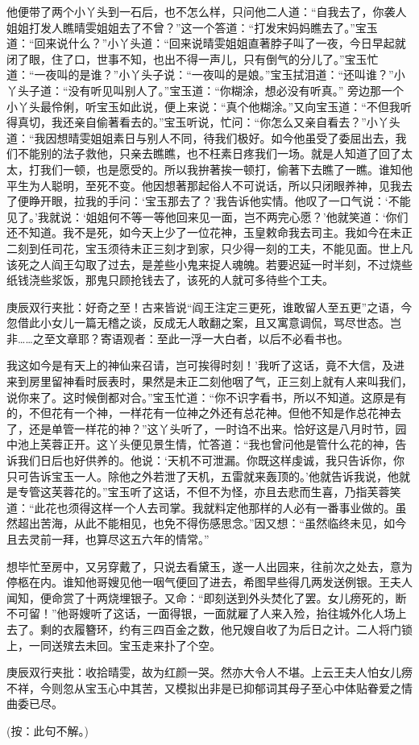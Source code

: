 \begin{parag}
    他便带了两个小丫头到一石后，也不怎么样，只问他二人道：“自我去了，你袭人姐姐打发人瞧晴雯姐姐去了不曾？”这一个答道：“打发宋妈妈瞧去了。”宝玉道：“回来说什么？”小丫头道：“回来说晴雯姐姐直著脖子叫了一夜，今日早起就闭了眼，住了口，世事不知，也出不得一声儿，只有倒气的分儿了。”宝玉忙道：“一夜叫的是谁？”小丫头子说：“一夜叫的是娘。”宝玉拭泪道：“还叫谁？”小丫头子道：“没有听见叫别人了。”宝玉道：“你糊涂，想必没有听真。” 旁边那一个小丫头最伶俐，听宝玉如此说，便上来说：“真个他糊涂。”又向宝玉道：“不但我听得真切，我还亲自偷著看去的。”宝玉听说，忙问：“你怎么又亲自看去？”小丫头道：“我因想晴雯姐姐素日与别人不同，待我们极好。如今他虽受了委屈出去，我们不能别的法子救他，只亲去瞧瞧，也不枉素日疼我们一场。就是人知道了回了太太，打我们一顿，也是愿受的。所以我拚著挨一顿打，偷著下去瞧了一瞧。谁知他平生为人聪明，至死不变。他因想著那起俗人不可说话，所以只闭眼养神，见我去了便睁开眼，拉我的手问：‘宝玉那去了？’我告诉他实情。他叹了一口气说：‘不能见了。’我就说：‘姐姐何不等一等他回来见一面，岂不两完心愿？’他就笑道：‘你们还不知道。我不是死，如今天上少了一位花神，玉皇敕命我去司主。我如今在未正二刻到任司花，宝玉须待未正三刻才到家，只少得一刻的工夫，不能见面。世上凡该死之人阎王勾取了过去，是差些小鬼来捉人魂魄。若要迟延一时半刻，不过烧些纸钱浇些浆饭，那鬼只顾抢钱去了，该死的人就可多待些个工夫。\begin{note}庚辰双行夹批：好奇之至！古来皆说“阎王注定三更死，谁敢留人至五更”之语，今忽借此小女儿一篇无稽之谈，反成无人敢翻之案，且又寓意调侃，骂尽世态。岂非……之至文章耶？寄语观者：至此一浮一大白者，以后不必看书也。\end{note}我这如今是有天上的神仙来召请，岂可挨得时刻！’我听了这话，竟不大信，及进来到房里留神看时辰表时，果然是未正二刻他咽了气，正三刻上就有人来叫我们，说你来了。这时候倒都对合。”宝玉忙道：“你不识字看书，所以不知道。这原是有的，不但花有一个神，一样花有一位神之外还有总花神。但他不知是作总花神去了，还是单管一样花的神？”这丫头听了，一时诌不出来。恰好这是八月时节，园中池上芙蓉正开。这丫头便见景生情，忙答道：“我也曾问他是管什么花的神，告诉我们日后也好供养的。他说：‘天机不可泄漏。你既这样虔诚，我只告诉你，你只可告诉宝玉一人。除他之外若泄了天机，五雷就来轰顶的。’他就告诉我说，他就是专管这芙蓉花的。”宝玉听了这话，不但不为怪，亦且去悲而生喜，乃指芙蓉笑道：“此花也须得这样一个人去司掌。我就料定他那样的人必有一番事业做的。虽然超出苦海，从此不能相见，也免不得伤感思念。”因又想：“虽然临终未见，如今且去灵前一拜，也算尽这五六年的情常。”
\end{parag}


\begin{parag}
    想毕忙至房中，又另穿戴了，只说去看黛玉，遂一人出园来，往前次之处去，意为停柩在内。谁知他哥嫂见他一咽气便回了进去，希图早些得几两发送例银。王夫人闻知，便命赏了十两烧埋银子。又命：“即刻送到外头焚化了罢。女儿痨死的，断不可留！”他哥嫂听了这话，一面得银，一面就雇了人来入殓，抬往城外化人场上去了。剩的衣履簪环，约有三四百金之数，他兄嫂自收了为后日之计。二人将门锁上，一同送殡去未回。宝玉走来扑了个空。\begin{note}庚辰双行夹批：收拾晴雯，故为红颜一哭。然亦大令人不堪。上云王夫人怕女儿痨不祥，今则忽从宝玉心中其苦，又模拟出非是已抑郁词其母子至心中体贴眷爱之情曲委已尽。\end{note}(按：此句不解。)
\end{parag}


